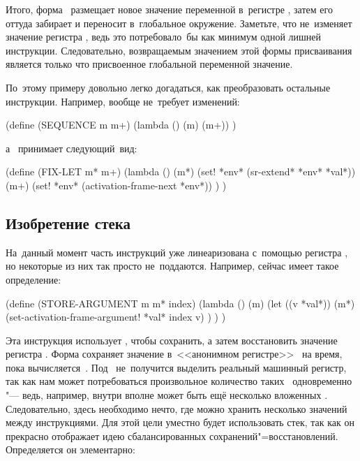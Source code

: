 Итого, форма~ размещает новое значение переменной в~регистре ,
затем его оттуда забирает  и переносит в~глобальное
окружение. Заметьте, что  не~изменяет значение регистра
, ведь это потребовало~бы как минимум одной лишней инструкции.
Следовательно, возвращаемым значением этой формы присваивания является только
что присвоенное глобальной переменной значение.

По~этому примеру довольно легко догадаться, как преобразовать остальные
инструкции. Например,  вообще не~требует изменений:

\begin{code:lisp}
(define (SEQUENCE m m+)
  (lambda () (m) (m+)) )
\end{code:lisp}

\noindent
а~ принимает следующий~вид:

\begin{code:lisp}
(define (FIX-LET m* m+)
  (lambda ()
    (m*)
    (set! *env* (sr-extend* *env* *val*))
    (m+)
    (set! *env* (activation-frame-next *env*)) ) )
\end{code:lisp}


\subsection{Изобретение стека}\label{compilation/bytes/ssect:stack}

На~данный момент часть инструкций уже линеаризована с~помощью регистра
, но некоторые из них так просто не~поддаются. Например,
 сейчас имеет такое определение:

\begin{code:lisp}
(define (STORE-ARGUMENT m m* index)
  (lambda ()
    (m)
    (let ((v *val*))
      (m*)
      (set-activation-frame-argument! *val* index v) ) ) )
\end{code:lisp}

Эта инструкция использует , чтобы сохранить, а затем восстановить
значение регистра . Форма  сохраняет значение в~<<анонимном
регистре>>~ на время, пока вычисляется~. Под~ не~получится
выделить реальный машинный регистр, так как нам может потребоваться произвольное
количество таких~ одновременно "--- ведь, например, внутри  вполне
может быть ещё несколько вложенных . Следовательно, здесь
необходимо нечто, где можно хранить несколько значений между инструкциями. Для
этой цели уместно будет использовать стек, так как он прекрасно отображает идею
сбалансированных сохранений"=восстановлений. Определяется он элементарно:

